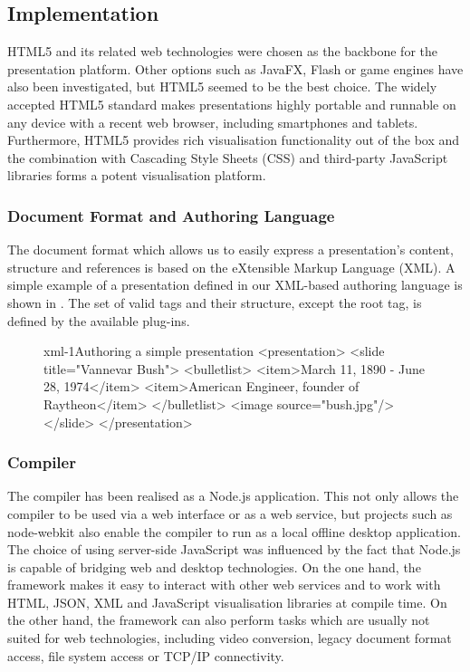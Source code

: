    \subsection{Implementation}

    HTML5 and its related web technologies were chosen as the backbone for
    the \mxp presentation platform. Other options such as JavaFX, Flash or game
    engines have also been investigated, but HTML5 seemed to be the best choice.
    The widely accepted HTML5 standard makes \mxp presentations highly portable and
    runnable on any device with a recent web browser, including smartphones and
    tablets. Furthermore, HTML5 provides rich visualisation functionality out of
    the box and the combination with Cascading Style Sheets
    (CSS) and third-party JavaScript libraries forms a potent visualisation
    platform.

    \subsubsection{Document Format and Authoring Language}

     The \mxp document format which allows us to easily express a
     presentation's content, structure and references is based on the
     eXtensible Markup Language (XML). A simple example of a presentation
     defined in our XML-based authoring language is shown in .
     The set of valid tags and their structure, except the 
     root tag, is defined by the available plug-ins.

     \begin{figure}[h!]
      \begin{lstxml}{xml-1}{Authoring a simple \mxp presentation}
<presentation>
  <slide title="Vannevar Bush">
    <bulletlist>
      <item>March 11, 1890 - June 28, 1974</item>
      <item>American Engineer, founder of Raytheon</item>
    </bulletlist>
    <image source="bush.jpg"/>
  </slide>
</presentation>
      \end{lstxml}
     \end{figure}

    \subsubsection{Compiler}

     The compiler has been realised as a Node.js application. This not only
     allows the compiler to be used via a web interface or as a web service,
     but projects such as node-webkit also enable the compiler to run as a
     local offline desktop application. The choice of using server-side
     JavaScript was influenced by the fact that Node.js is capable of bridging
     web and desktop technologies. On the one hand, the framework makes it easy
     to interact with other web services and to work with HTML, JSON, XML and
     JavaScript visualisation libraries at compile time. On the other hand, the
     framework can also perform tasks which are usually not suited for web
     technologies, including video conversion, legacy document format access,
     file system access or TCP/IP connectivity.

